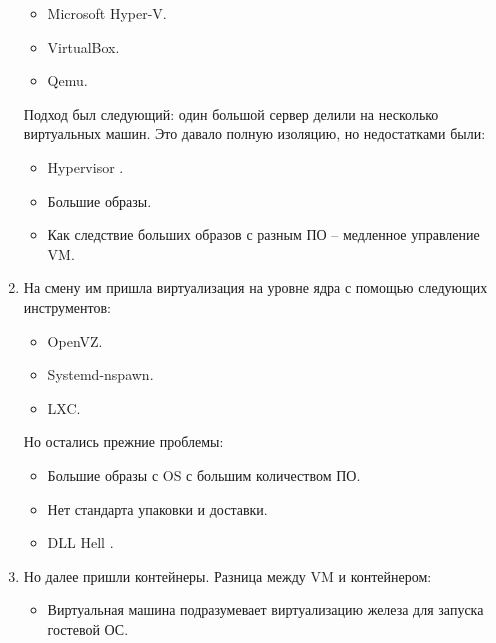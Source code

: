 \begin{enumerate}
\begin{itemize}
            \item Microsoft Hyper-V.
            \item VirtualBox.
            \item Qemu.
        \end{itemize}
        Подход был следующий: один большой сервер делили на несколько виртуальных машин. Это давало полную изоляцию, но недостатками были:
        \begin{itemize}
            \item Hypervisor \cite{wiki:hypervisor}.
            \item Большие образы.
            \item Как следствие больших образов с разным ПО -- медленное управление VM.
        \end{itemize}
    \item На смену им пришла виртуализация на уровне ядра с помощью следующих инструментов:
        \begin{itemize}
            \item OpenVZ.
            \item Systemd-nspawn.
            \item LXC.
        \end{itemize}
        Но остались прежние проблемы:
        \begin{itemize}
            \item Большие образы с OS с большим количеством ПО.
            \item Нет стандарта упаковки и доставки.
            \item DLL Hell \cite{dick2018dll}.
        \end{itemize}
    \item Но далее пришли контейнеры. Разница между VM и контейнером:
        \begin{itemize}
            \item Виртуальная машина подразумевает виртуализацию железа для запуска гостевой ОС.

\end{itemize}
\end{enumerate}
